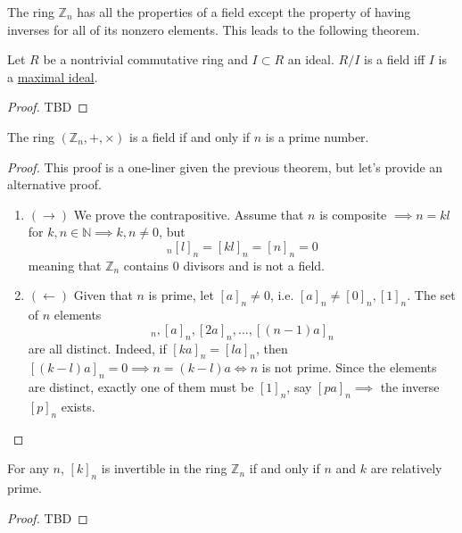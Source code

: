   The ring $\mathbb{Z}_n$ has all the properties of a field except the property of having inverses for all of its nonzero elements. This leads to the following theorem. 

  \begin{theorem}
    \label{thm:quotient_ring_fields}
    Let $R$ be a nontrivial commutative ring and $I \subset R$ an ideal. $R/I$ is a field iff $I$ is a \hyperref[def:maximal-ideal]{maximal ideal}. 
  \end{theorem}
  \begin{proof}
    TBD
  \end{proof}

  \begin{corollary}
    \label{thm:integer-quotient-rings-as-finite-fields}
    The ring $(\mathbb{Z}_{n}, +, \times)$ is a field if and only if $n$ is a prime number. 
  \end{corollary}
  \begin{proof}
    This proof is a one-liner given the previous theorem, but let's provide an alternative proof. 
    \begin{enumerate}
      \item $(\rightarrow)$ We prove the contrapositive. Assume that $n$ is composite $\implies n = k l$ for $k, n \in \mathbb{N} \implies k, n \neq 0$, but 
      \begin{equation}
        [k]_n [l]_n = [k l]_n = [n]_n = 0
      \end{equation}
      meaning that $\mathbb{Z}_n$ contains $0$ divisors and is not a field. 

      \item $(\leftarrow)$ Given that $n$ is prime, let $[a]_n \neq 0$, i.e. $[a]_n \neq [0]_n, [1]_n$. The set of $n$ elements 
      \begin{equation}
        [0]_n, [a]_n, [2a]_n, ..., [(n-1)a]_n
      \end{equation}
      are all distinct. Indeed, if $[k a]_n = [l a]_n$, then $[(k-l) a]_n = 0 \implies n = (k-l) a \iff n$ is not prime. Since the elements are distinct, exactly one of them must be $[1]_n$, say $[p a]_n \implies$ the inverse $[p]_n$ exists. 
    \end{enumerate}
  \end{proof}

  \begin{corollary}
    \label{thm:invertibility-in-zn}
    For any $n$, $[k]_n$ is invertible in the ring $\mathbb{Z}_n$ if and only if $n$ and $k$ are relatively prime. 
  \end{corollary} 
  \begin{proof}
    TBD
  \end{proof}

